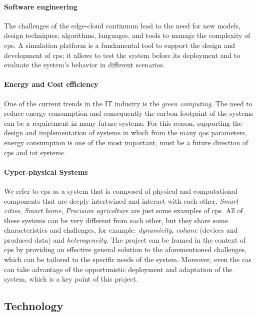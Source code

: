 \documentclass[12pt]{article}
\begin{document}
\paragraph{Software engineering}
The challenges of the edge-cloud continuum lead to the need for new models,
design techniques, algorithms, languages, and tools to manage the complexity
of \ac{cps}.
%
A simulation platform is a fundamental tool to support the design and development of \ac{cps};
it allows to test the system before its deployment and to evaluate the system's behavior
in different scenarios.

\paragraph{Energy and Cost efficiency}
One of the current trends in the IT industry is the \emph{green computing}.
%
The need to reduce energy consumption and consequently the carbon footprint of the systems can be a requirement in many future systems.
%
For this reason,
supporting the design and implementation of systems in which from the many \ac{qos} parameters,
energy consumption is one of the most important,
must be a future direction of \ac{cps} and \ac{iot} systems.

\paragraph{Cyper-physical Systems}
We refer to \ac{cps} as a system that is composed of physical and computational components
that are deeply intertwined and interact with each other.
%
\emph{Smart cities}, \emph{Smart home}, \emph{Precision agricolture} are just some examples of \ac{cps}.
%
All of these systems can be very different from each other,
but they share some characteristics and challenges,
for example: \emph{dynamicity}, \emph{volume} (devices and produced data) and \emph{heterogeneity}.
%
The project can be framed in the context of \ac{cps} by providing an effective general solution to the aforementioned challenges,
which can be tailored to the specific needs of the system.
%
Moreover,
even the \ac{cas} can take advantage of the opportunistic deployment and adaptation of the system,
which is a key point of this project.

\subsection{Technology}\label{subsec:technology}
\end{document}
